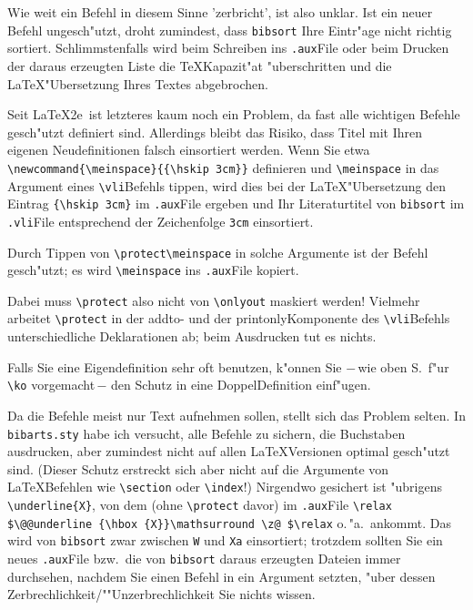 \documentclass[12pt,a4paper]{article}
\begin{document}
Wie weit ein Befehl in diesem Sinne 'zerbricht', ist also unklar. Ist
ein neuer Befehl ungesch"utzt, droht zumindest, dass \verb|bibsort| Ihre
Eintr"age nicht richtig sortiert. Schlimmstenfalls wird beim Schreiben 
ins \verb|.aux|\hy File oder beim Drucken der daraus erzeugten Liste die 
\TeX\hy Kapazit"at "uberschritten und die \LaTeX\hy "Ubersetzung Ihres 
Textes abgebrochen.

Seit \LaTeX2e\ ist letzteres kaum noch ein Problem, da fast alle wichtigen
Befehle gesch"utzt definiert sind. Allerdings bleibt das Risiko, dass
Titel mit Ihren eigenen Neudefinitionen falsch einsortiert werden. Wenn Sie etwa
\verb|\newcommand{\meinspace}{{\hskip 3cm}}| definieren und
\verb|\meinspace| in das Argument eines \verb|\vli|\hy Befehls tippen, 
wird dies bei der \LaTeX\hy "Ubersetzung den Eintrag 
\verb|{\hskip 3cm}| im \verb|.aux|\hy File ergeben und Ihr
Literaturtitel von \verb|bibsort| im \verb|.vli|\hy File 
entsprechend der Zeichenfolge \verb|3cm| einsortiert.

 Durch Tippen von \verb|\protect\meinspace|
in solche Argumente ist der Befehl gesch"utzt; es wird \verb|\meinspace| 
ins \verb|.aux|\hy File kopiert.

Dabei muss \verb|\protect| also nicht von \verb|\onlyout| maskiert werden!
Vielmehr arbeitet \verb|\protect| in der addto- und der printonly\hy Komponente
des \verb|\vli|\hy Befehls unterschiedliche Deklarationen ab; beim Ausdrucken 
tut es nichts.

Falls Sie eine Eigendefinition sehr oft benutzen, k"onnen Sie $-$\,wie
oben S.\,\pageref{ProtectBeispiel} f"ur \verb|\ko| vorgemacht\,$-$ den 
Schutz in eine Doppel\hy Definition einf"ugen.

Da die \BibArts\hy Befehle meist nur Text aufnehmen sollen, stellt sich das
Problem selten. In \verb|bibarts.sty| habe ich versucht, alle Befehle zu 
sichern, die Buchstaben ausdrucken, aber zumindest nicht auf
allen \LaTeX\hy Versionen optimal gesch"utzt sind. (Dieser Schutz erstreckt
sich aber nicht auf die Argumente von \LaTeX\hy Befehlen wie 
\verb|\section| oder \verb|\index|!) Nirgendwo gesichert ist "ubrigens 
\verb|\underline{X}|, von dem (ohne \verb|\protect| davor)
im \verb|.aux|\hy File \verb|\relax $\@@underline {\hbox {X}}\mathsurround \z@ $\relax| 
o.\,"a.\ ankommt. Das wird von \verb|bibsort| zwar zwischen \verb|W|
und \verb|Xa| einsortiert; trotzdem sollten Sie ein neues \verb|.aux|\hy File
bzw.\ die von \verb|bibsort| daraus erzeugten Dateien immer durchsehen,
nachdem Sie einen Befehl in ein \BibArts\hy Argument setzten,
"uber dessen Zerbrechlichkeit/""Unzerbrechlichkeit Sie nichts wissen.
\end{document}
